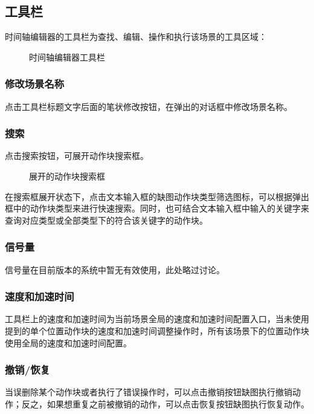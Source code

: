 \subsection{工具栏}
时间轴编辑器的工具栏为查找、编辑、操作和执行该场景的工具区域：

\begin{figure}[ht]
	\centering
	\color{red}{缺图}
	\caption{时间轴编辑器工具栏}
	\label{fig:时间轴编辑器工具栏}
\end{figure}

\subsubsection{修改场景名称}
点击工具栏标题文字后面的笔状修改按钮，在弹出的对话框中修改场景名称。
\subsubsection{搜索}
点击搜索按钮，可展开动作块搜索框。

\begin{figure}[ht]
	\centering
	\color{red}{缺图}
	\caption{展开的动作块搜索框}
	\label{fig:展开的动作块搜索框}
\end{figure}

在搜索框展开状态下，点击文本输入框的{\color{red}缺图}动作块类型筛选图标，可以根据弹出框中的动作块类型来进行快速搜索。同时，也可结合文本输入框中输入的关键字来查询对应类型或全部类型下的符合该关键字的动作块。
\subsubsection{信号量}
信号量在目前版本的\LM 系统中暂无有效使用，此处略过讨论。
\subsubsection{速度和加速时间}
\label{sec:速度和加速时间}
工具栏上的速度和加速时间为当前场景全局的速度和加速时间配置入口，当未使用提到的单个位置动作块的速度和加速时间调整操作时，所有该场景下的位置动作块使用全局的速度和加速时间配置。
\subsubsection{撤销/恢复}
当误删除某个动作块或者执行了错误操作时，可以点击撤销按钮{\color{red}缺图}执行撤销动作；反之，如果想重复之前被撤销的动作，可以点击恢复按钮{\color{red}缺图}执行恢复动作。

